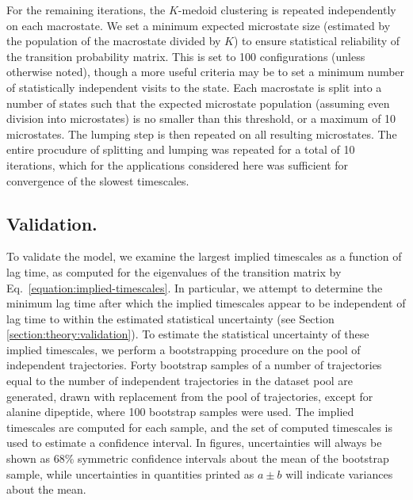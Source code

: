For the remaining iterations, the $K$-medoid clustering is repeated independently on each macrostate.
We set a minimum expected microstate size (estimated by the population of the macrostate divided by $K$) to ensure statistical reliability of the transition probability matrix.
This is set to 100 configurations (unless otherwise noted), though a more useful criteria may be to set a minimum number of statistically independent visits to the state.
Each macrostate is split into a number of states such that the expected microstate population (assuming even division into microstates) is no smaller than this threshold, or a maximum of 10 microstates.
The lumping step is then repeated on all resulting microstates.
The entire procudure of splitting and lumping was repeated for a total of 10 iterations, which for the applications considered here was sufficient for convergence of the slowest timescales.

\subsection{Validation.}
\label{section:methods:validation}

To validate the model, we examine the largest implied timescales as a function of lag time, as computed for the eigenvalues of the transition matrix by Eq.\ \ref{equation:implied-timescales}.
In particular, we attempt to determine the minimum lag time after which the implied timescales appear to be independent of lag time to within the estimated statistical uncertainty (see Section \ref{section:theory:validation}).
To estimate the statistical uncertainty of these implied timescales, we perform a bootstrapping procedure \cite{efron:1979a} on the pool of independent trajectories.
Forty bootstrap samples of a number of trajectories equal to the number of independent trajectories in the dataset pool are generated, drawn with replacement from the pool of trajectories, except for alanine dipeptide, where 100 bootstrap samples were used.
The implied timescales are computed for each sample, and the set of computed timescales is used to estimate a confidence interval.
In figures, uncertainties will always be shown as 68\% symmetric confidence intervals about the mean of the bootstrap sample, while uncertainties in quantities printed as $a \pm b$ will indicate variances about the mean.





